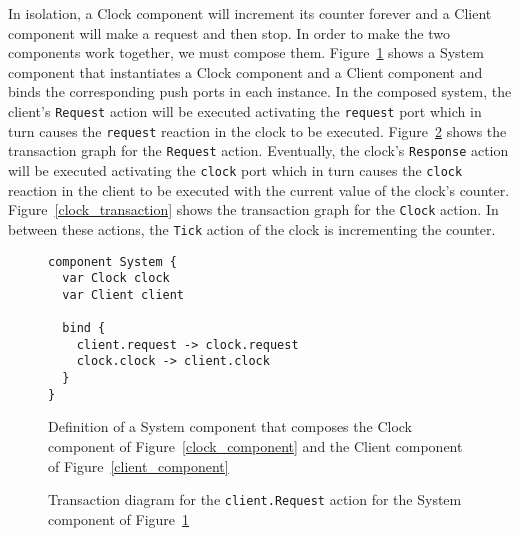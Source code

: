 In isolation, a Clock component will increment its counter forever and a Client component will make a request and then stop.
In order to make the two components work together, we must compose them.
Figure~\ref{system_component} shows a System component that instantiates a Clock component and a Client component and binds the corresponding push ports in each instance.
In the composed system, the client's \verb+Request+ action will be executed activating the \verb+request+ port which in turn causes the \verb+request+ reaction in the clock to be executed.
Figure~\ref{request_transaction} shows the transaction graph for the \verb+Request+ action.
Eventually, the clock's \verb+Response+ action will be executed activating the \verb+clock+ port which in turn causes the \verb+clock+ reaction in the client to be executed with the current value of the clock's counter.
Figure~\ref{clock_transaction} shows the transaction graph for the \verb+Clock+ action.
In between these actions, the \verb+Tick+ action of the clock is incrementing the counter.

\begin{figure}
\begin{verbatim}
component System {
  var Clock clock
  var Client client

  bind {
    client.request -> clock.request
    clock.clock -> client.clock
  }
}
\end{verbatim}
\caption{Definition of a System component that composes the Clock component of Figure~\ref{clock_component} and the Client component of Figure~\ref{client_component}}
\label{system_component}
\end{figure}

\begin{figure}
\centering
\cprotect\caption{Transaction diagram for the \verb+client.Request+ action for the System component of Figure~\ref{system_component}}
\label{request_transaction}
\end{figure}

